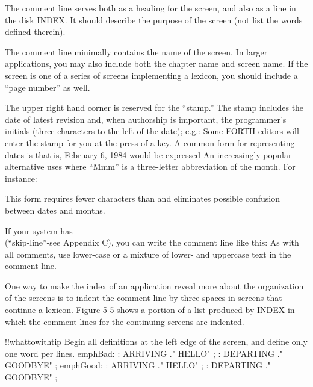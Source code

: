 The comment line serves both as a heading for the screen, and also as a
line in the disk INDEX.  It should describe the purpose of the screen (not
list the words defined therein).

The comment line minimally contains the name of the screen.  In
larger applications, you may also include both the chapter name and
screen name.  If the screen is one of a series of screens implementing a
lexicon, you should include a ``page number'' as well.

The upper right hand corner is reserved for the ``stamp.'' The stamp
includes the date of latest revision and, when authorship is important,
the programmer's initials (three characters to the left of the date); e.g.:
Some FORTH editors will enter the stamp for you at the press of a key.
A common form for representing dates is
that is, February 6, 1984 would be expressed
An increasingly popular alternative uses
where ``Mmm'' is a three-letter abbreviation of the month.  For instance:

This form requires fewer characters than
and eliminates possible confusion between dates and months.

If your system has \\ (``skip-line''-see Appendix C), you can write
the comment line like this:
As with all comments, use lower-case or a mixture of lower- and uppercase
text in the comment line.

One way to make the index of an application reveal more about the
organization of the screens is to indent the comment line by three spaces
in screens that continue a lexicon.  Figure 5-5 shows a portion of a list produced
by INDEX in which the comment lines for the continuing screens
are indented.

!!whattowithtip{
Begin all definitions at the left edge of the screen, and define only one word
per lines.
}
emph{Bad:}
: ARRIVING ." HELLO" ;  : DEPARTING ." GOODBYE" ;
emph{Good:}
: ARRIVING  ." HELLO" ;
: DEPARTING ." GOODBYE" ;

